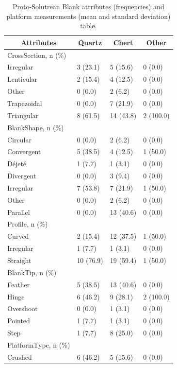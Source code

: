 \documentclass[12pt,twoside]{reedthesis}
\begin{document}
\begin{longtable}[t]{llll}
\caption{\label{tab:unnamed-chunk-74}Proto-Solutrean Blank attributes (frequencies) and platform measurements (mean and standard deviation) table.}\\
\toprule
\multicolumn{1}{c}{\textbf{Attributes}} & \multicolumn{1}{c}{\textbf{Quartz}} & \multicolumn{1}{c}{\textbf{Chert}} & \multicolumn{1}{c}{\textbf{Other}}\\
\midrule
CrossSection, n (\%) &  &  & \\
Irregular & 3 (23.1) & 5 (15.6) & 0 (0.0)\\
Lenticular & 2 (15.4) & 4 (12.5) & 0 (0.0)\\
Other & 0 (0.0) & 2 (6.2) & 0 \vphantom{1} (0.0)\\
Trapezoidal & 0 (0.0) & 7 (21.9) & 0 (0.0)\\
\addlinespace
Triangular & 8 (61.5) & 14 (43.8) & 2 (100.0)\\
BlankShape, n (\%) &  &  & \\
Circular & 0 (0.0) & 2 (6.2) & 0 (0.0)\\
Convergent & 5 (38.5) & 4 (12.5) & 1 (50.0)\\
Déjeté & 1 (7.7) & 1 (3.1) & 0 (0.0)\\
\addlinespace
Divergent & 0 (0.0) & 3 (9.4) & 0 (0.0)\\
Irregular & 7 (53.8) & 7 (21.9) & 1 (50.0)\\
Other & 0 (0.0) & 2 (6.2) & 0 (0.0)\\
Parallel & 0 (0.0) & 13 (40.6) & 0 (0.0)\\
Profile, n (\%) &  &  & \\
\addlinespace
Curved & 2 (15.4) & 12 (37.5) & 1 (50.0)\\
Irregular & 1 (7.7) & 1 (3.1) & 0 (0.0)\\
Straight & 10 (76.9) & 19 (59.4) & 1 (50.0)\\
BlankTip, n (\%) &  &  & \\
Feather & 5 (38.5) & 13 (40.6) & 0 (0.0)\\
\addlinespace
Hinge & 6 (46.2) & 9 (28.1) & 2 (100.0)\\
Overshoot & 0 (0.0) & 1 (3.1) & 0 (0.0)\\
Pointed & 1 (7.7) & 1 (3.1) & 0 (0.0)\\
Step & 1 (7.7) & 8 (25.0) & 0 (0.0)\\
PlatformType, n (\%) &  &  & \\
\addlinespace
Crushed & 6 (46.2) & 5 (15.6) & 0 (0.0)\\

\end{longtable}
\end{document}
